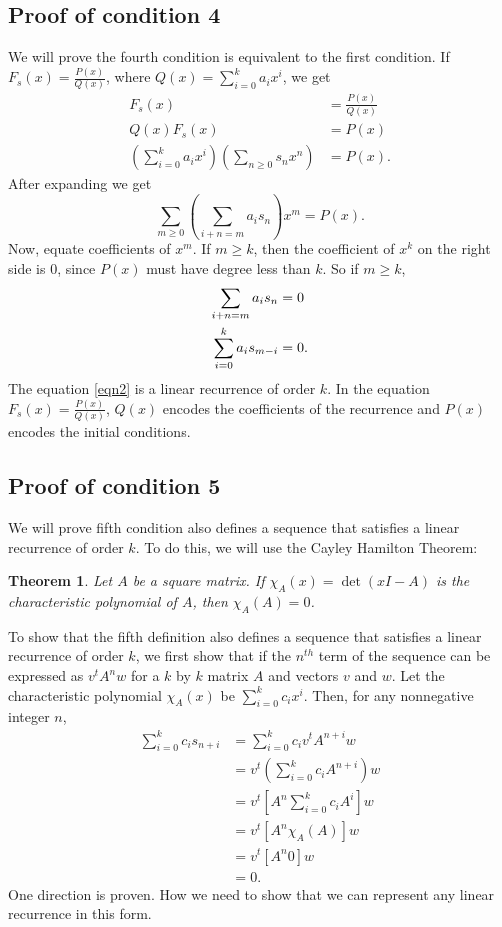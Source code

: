 \documentclass[11pt]{article}
\newtheorem{theorem}{Theorem}
\begin{document}
\subsection{Proof of condition 4}
We will prove the fourth condition is equivalent to the first condition. If $F_{s}(x)=\frac{P(x)}{Q(x)}$, where $Q(x)=\displaystyle\sum_{i=0}^{k}{a_{i}x^{i}}$, we get
\begin{align*}
F_{s}(x)&=\frac{P(x)}{Q(x)}\\
Q(x)F_{s}(x)&=P(x)\\
\left(\sum_{i=0}^{k}{a_{i}x^{i}}\right)\left(\sum_{n\geq 0}{s_{n}x^{n}}\right)&=P(x).
\end{align*}
After expanding we get
\begin{equation*}
\sum_{m\geq 0}{\left(\sum_{i+n=m}{a_{i}s_{n}}\right)x^{m}}=P(x).
\end{equation*}
Now, equate coefficients of $x^{m}$. If $m\geq k$, then the coefficient of $x^{k}$ on the right side is 0, since $P(x)$ must have degree less than $k$. So if $m\geq k$,
\begin{align}
\sum_{i+n=m}{a_{i}s_{n}}&=0\notag\\
\label{eqn2}
\sum_{i=0}^{k}{a_{i}s_{m-i}}&=0.
\end{align}
The equation \eqref{eqn2} is a linear recurrence of order $k$. In the equation $F_{s}(x)=\frac{P(x)}{Q(x)}$, $Q(x)$ encodes the coefficients of the recurrence and $P(x)$ encodes the initial conditions. 

\subsection{Proof of condition 5}
We will prove fifth condition also defines a sequence that satisfies a linear recurrence of order $k$. To do this, we will use the Cayley Hamilton Theorem:
\begin{theorem}
Let $A$ be a square matrix. If $\chi_{A}(x)=\det(xI-A)$ is the characteristic polynomial of $A$, then $\chi_{A}(A)=0$.
\end{theorem}

To show that the fifth definition also defines a sequence that satisfies a linear recurrence of order $k$, we first show that if the $n^{th}$ term of the sequence can be expressed as $v^{t}A^{n}w$ for a $k$ by $k$ matrix $A$ and vectors $v$ and $w$. Let the characteristic polynomial $\chi_{A}(x)$ be $\displaystyle\sum_{i=0}^{k}{c_{i}x^{i}}$. Then, for any nonnegative integer $n$,
\begin{align*}
\sum_{i=0}^{k}{c_{i}s_{n+i}}&=\sum_{i=0}^{k}{c_{i}v^{t}A^{n+i}w}\\
&=v^{t}\left(\sum_{i=0}^{k}{c_{i}A^{n+i}}\right)w\\
&=v^{t}\left[A^{n}\sum_{i=0}^{k}{c_{i}A^{i}}\right]w\\
&=v^{t}\left[A^{n}\chi_{A}(A)\right]w\\
&=v^{t}\left[A^{n}0\right]w\\
&=0.
\end{align*}
One direction is proven. How we need to show that we can represent any linear recurrence in this form. 
\end{document}
